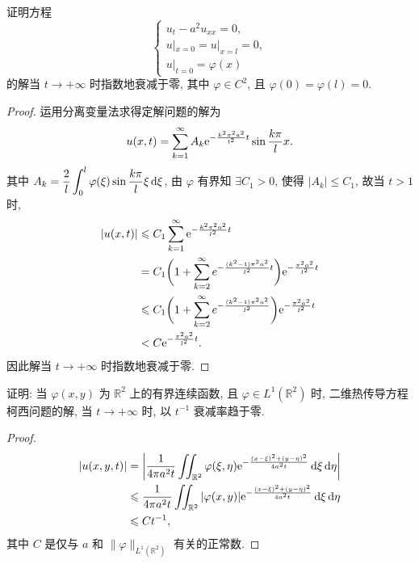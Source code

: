 \begin{exercise}
  证明方程
  \[\begin{cases}
    u_t - a^2 u_{xx} = 0, \\
    u|_{x=0} = u|_{x=l} = 0, \\
    u|_{t=0} = \varphi(x)
  \end{cases}\]
  的解当 $t\to +\infty$ 时指数地衰减于零, 其中 $\varphi\in C^2$,
  且 $\varphi(0) = \varphi(l) = 0$.
\end{exercise}

\begin{proof}
  运用分离变量法求得定解问题的解为
  \[u(x,t) = \sum_{k=1}^{\infty} A_k \mathrm{e}^{-\frac{k^2\pi^2a^2}{l^2}t}\sin\frac{k\pi}{l}x.\]
  其中 $\displaystyle A_k=\frac{2}{l} \int_0^l \varphi(\xi) \sin\frac{k\pi}{l}\xi\mathop{}\!\mathrm{d}\xi$,
  由 $\varphi$ 有界知 $\exists C_1>0$, 使得 $|A_k|\leq C_1$, 故当 $t>1$ 时,
  \[\begin{split}
  |u(x,t)|
  & \leqslant C_1\sum_{k=1}^{\infty} \mathrm{e}^{-\frac{k^2\pi^2a^2}{l^2}t} \\
  & = C_1\biggl(1+\sum_{k=2}^{\infty}e^{-\frac{(k^2-1)\pi^2a^2}{l^2}t}\biggr)
      \mathrm{e}^{-\frac{\pi^2a^2}{l^2}t} \\
  & \leqslant C_1\biggl(1+\sum_{k=2}^{\infty}e^{-\frac{(k^2-1)\pi^2a^2}{l^2}}\biggr)
      \mathrm{e}^{-\frac{\pi^2a^2}{l^2}t} \\
  & < C\mathrm{e}^{-\frac{\pi^2a^2}{l^2}t}.
  \end{split}\]
  因此解当 $t\to+\infty$ 时指数地衰减于零.
\end{proof}


\begin{exercise}
  证明: 当 $\varphi(x,y)$ 为 $\mathbb{R}^2$ 上的有界连续函数, 且 $\varphi\in L^1(\mathbb{R}^2)$
  时, 二维热传导方程柯西问题的解, 当 $t\to +\infty$ 时, 以 $t^{-1}$ 衰减率趋于零.
\end{exercise}

\begin{proof}
  \[\begin{split}
    |u(x,y,t)|
    & = \left|\frac{1}{4\pi a^2t} \iint_{\mathbb{R}^2} \varphi(\xi,\eta)
        \mathrm{e}^{-\frac{(x-\xi)^2+(y-\eta)^2}{4a^2t}}\mathop{}\!\mathrm{d}\xi\mathop{}\!\mathrm{d}\eta\right| \\
    & \leqslant \frac{1}{4\pi a^2t} \iint_{\mathbb{R}^2} |\varphi(x,y)|
        \mathrm{e}^{-\frac{(x-\xi)^2+(y-\eta)^2}{4a^2t}}\mathop{}\!\mathrm{d}\xi\mathop{}\!\mathrm{d}\eta \\
    & \leqslant Ct^{-1},
  \end{split}\]
  其中 $C$ 是仅与 $a$ 和 $\|\varphi\|_{L^1(\mathbb{R}^2)}$ 有关的正常数.
\end{proof}